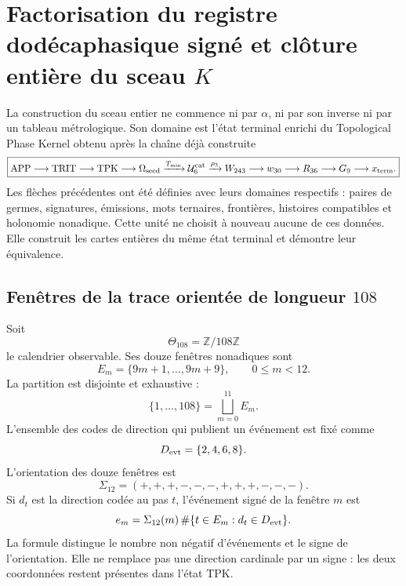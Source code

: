 
\section{Factorisation du registre dodécaphasique signé et clôture entière du sceau \(K\)}
\label{p3-83-c25-s4:chap:registro-dodecafasico-hadamard-k}

La construction du sceau entier ne commence ni par \(\alpha\), ni par son inverse
ni par un tableau métrologique. Son domaine est l’état terminal enrichi
du Topological Phase Kernel obtenu après la chaîne déjà construite
\begin{equation}
 \boxed{
 \mathrm{APP}\longrightarrow\mathrm{TRIT}\longrightarrow\mathrm{TPK}
 \longrightarrow\Omega_{\rm seed}
 \xrightarrow{T_{\min}}\mathcal U_6^{\rm cat}
 \xrightarrow{\rho_3}W_{243}
 \longrightarrow w_{30}\longrightarrow R_{36}
 \longrightarrow G_9\longrightarrow x_{\rm term}.}
 \label{p3-83-c25-s4:eq:cadena-upstream-registro-dodecafasico}
\end{equation}
Les flèches précédentes ont été définies avec leurs domaines respectifs :
paires de germes, signatures, émissions, mots ternaires, frontières,
histoires compatibles et holonomie nonadique. Cette unité ne choisit à nouveau
aucune de ces données. Elle construit les cartes entières du même état
terminal et démontre leur équivalence.

\subsection{Fenêtres de la trace orientée de longueur \(108\)}

Soit
\[
 \Theta_{108}=\mathbb Z/108\mathbb Z
\]
le calendrier observable. Ses douze fenêtres nonadiques sont
\[
 E_m=\{9m+1,\ldots,9m+9\},
 \qquad 0\leq m<12.
\]
La partition est disjointe et exhaustive :
\[
 \{1,\ldots,108\}=\bigsqcup_{m=0}^{11}E_m.
\]
L’ensemble des codes de direction qui publient un événement est fixé comme
\[
 D_{\rm evt}=\{2,4,6,8\}.
\]
L’orientation des douze fenêtres est
\begin{equation}
 \Sigma_{12}=(+,+,+,-,-,-,+,+,+,-,-,-).
 \label{p3-83-c25-s4:eq:signatura-doce-ventanas}
\end{equation}
Si \(d_t\) est la direction codée au pas \(t\), l’événement signé
de la fenêtre \(m\) est
\begin{equation}
 e_m=\Sigma_{12}(m)\,
 \#\{t\in E_m:d_t\in D_{\rm evt}\}.
 \label{p3-83-c25-s4:eq:evento-firmado-ventana}
\end{equation}
La formule distingue le nombre non négatif d’événements et le signe de
l’orientation. Elle ne remplace pas une direction cardinale par un signe : les deux
coordonnées restent présentes dans l’état TPK.

